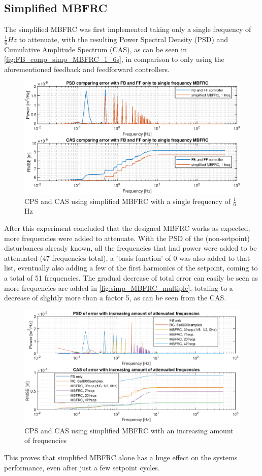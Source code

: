 \documentclass[journal]{IEEEtran}
\begin{document}
\subsection{Simplified MBFRC}
The simplified MBFRC was first implemented taking only a single frequency of $\frac{1}{6}Hz$ to attenuate, with the resulting Power Spectral Density (PSD) and Cumulative Amplitude Spectrum (CAS), as can be seen in \autoref{fig:FB_comp_simp_MBFRC_1_6s}, in comparison to only using the aforementioned feedback and feedforward controllers.
\begin{figure}
    \centering
    \includegraphics[width=0.9\linewidth]{figures/simple_MBFRC/comp_MBFRC_FB_PSD_CAS_2.eps}
    \caption{CPS and CAS using simplified MBFRC with a single frequency of $\frac{1}{6}$Hz}
    \label{fig:FB_comp_simp_MBFRC_1_6s}
\end{figure}
After this experiment concluded that the designed MBFRC works as expected, more frequencies were added to attenuate. With the PSD of the (non-setpoint) disturbances already known, all the frequencies that had power were added to be attenuated ($47$ frequencies total), a 'basis function' of $0$ was also added to that list, eventually also adding a few of the first harmonics of the setpoint, coming to a total of 51 frequencies. The gradual decrease of total error can easily be seen as more frequencies are added in \autoref{fig:simp_MBFRC_multiple}, totaling to a decrease of slightly more than a factor 5, as can be seen from the CAS.
\begin{figure}
    \centering
    \includegraphics[width=1\linewidth]{figures/simple_MBFRC/comp_moreFreqs_PSD_CAS_2.eps}
    \caption{CPS and CAS using simplified MBFRC with an increasing amount of frequencies}
    \label{fig:simp_MBFRC_multiple}
\end{figure}
This proves that simplified MBFRC alone has a huge effect on the systems performance, even after just a few setpoint cycles.
\end{document}
